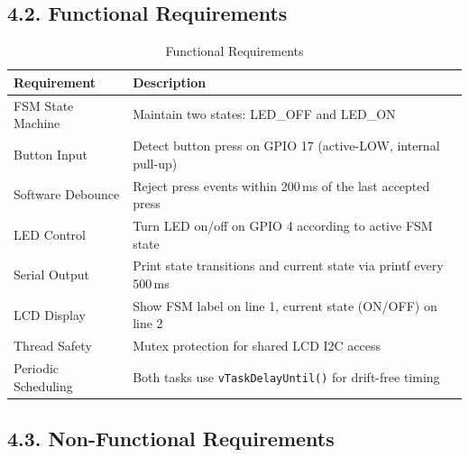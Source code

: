 \documentclass[12pt]{article}
\begin{document}
\subsection*{4.2. Functional Requirements}

\begin{table}[H]
    \centering
    \caption{Functional Requirements}
    \label{tab:functional-requirements}
    \begin{tabular}{|l|p{9cm}|}
        \hline
        \textbf{Requirement} & \textbf{Description} \\
        \hline
        FSM State Machine & Maintain two states: LED\_OFF and LED\_ON \\
        \hline
        Button Input & Detect button press on GPIO 17 (active-LOW, internal pull-up) \\
        \hline
        Software Debounce & Reject press events within 200\,ms of the last accepted press \\
        \hline
        LED Control & Turn LED on/off on GPIO 4 according to active FSM state \\
        \hline
        Serial Output & Print state transitions and current state via printf every 500\,ms \\
        \hline
        LCD Display & Show FSM label on line 1, current state (ON/OFF) on line 2 \\
        \hline
        Thread Safety & Mutex protection for shared LCD I2C access \\
        \hline
        Periodic Scheduling & Both tasks use \texttt{vTaskDelayUntil()} for drift-free timing \\
        \hline
    \end{tabular}
\end{table}

\subsection*{4.3. Non-Functional Requirements}
\end{document}
